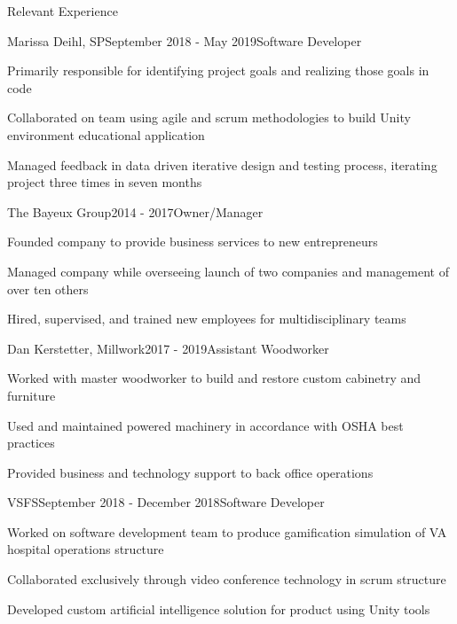 \documentclass{resume} %
\begin{document}
\begin{rSection}{Relevant Experience}

\begin{rWorkSubsection}{Marissa Deihl, SP}{September 2018 - May 2019}{Software Developer}{}
\item Primarily responsible for identifying project goals and realizing those goals in code
\item Collaborated on team using agile and scrum methodologies to build Unity environment educational application
\item Managed feedback in data driven iterative design and testing process, iterating project three times in seven months
\end{rWorkSubsection}
\fi

\begin{rWorkSubsection}{The Bayeux Group}{2014 - 2017}{Owner/Manager}{}
\item Founded company to provide business services to new entrepreneurs
\item Managed company while overseeing launch of two companies and management of over ten others
\item Hired, supervised, and trained new employees for multidisciplinary teams
\end{rWorkSubsection}


\begin{rWorkSubsection}{Dan Kerstetter, Millwork}{2017 - 2019}{Assistant Woodworker}{}
\item Worked with master woodworker to build and restore custom cabinetry and furniture
\item Used and maintained powered machinery in accordance with OSHA best practices
\item Provided business and technology support to back office operations
\end{rWorkSubsection}

\iffalse
\begin{rWorkSubsection}{VSFS}{September 2018 - December 2018}{Software Developer}{}
\item Worked on software development team to produce gamification simulation of VA hospital operations structure
\item Collaborated exclusively through video conference technology in scrum structure
\item Developed custom artificial intelligence solution for product using Unity tools
\end{rWorkSubsection}


\end{rSection}
\end{document}
